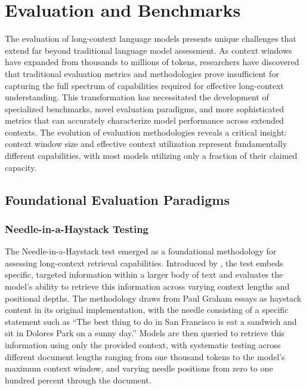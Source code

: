 \section{Evaluation and Benchmarks}
\label{sec:evaluation}

The evaluation of long-context language models presents unique challenges that extend far beyond traditional language model assessment. As context windows have expanded from thousands to millions of tokens, researchers have discovered that traditional evaluation metrics and methodologies prove insufficient for capturing the full spectrum of capabilities required for effective long-context understanding. This transformation has necessitated the development of specialized benchmarks, novel evaluation paradigms, and more sophisticated metrics that can accurately characterize model performance across extended contexts. The evolution of evaluation methodologies reveals a critical insight: context window size and effective context utilization represent fundamentally different capabilities, with most models utilizing only a fraction of their claimed capacity.

\subsection{Foundational Evaluation Paradigms}

\subsubsection{Needle-in-a-Haystack Testing}

The Needle-in-a-Haystack test emerged as a foundational methodology for assessing long-context retrieval capabilities. Introduced by \citet{kamradt2023needle}, the test embeds specific, targeted information within a larger body of text and evaluates the model's ability to retrieve this information across varying context lengths and positional depths. The methodology draws from Paul Graham essays as haystack content in its original implementation, with the needle consisting of a specific statement such as ``The best thing to do in San Francisco is eat a sandwich and sit in Dolores Park on a sunny day.'' Models are then queried to retrieve this information using only the provided context, with systematic testing across different document lengths ranging from one thousand tokens to the model's maximum context window, and varying needle positions from zero to one hundred percent through the document.


